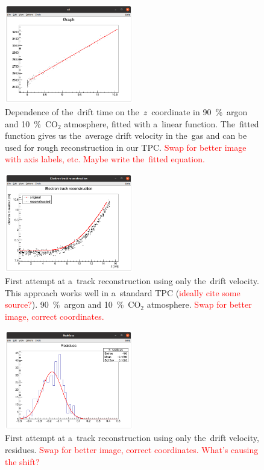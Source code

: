\documentclass[]{article}
\begin{document}
			\begin{figure}
				\centering
				\includegraphics[width=0.5\textwidth]{9010_zt.png}
				\caption{Dependence of the~drift time on the~$z$~coordinate in 90~\%~argon and 10~\%~CO$_2$ atmosphere, fitted with a~linear function. The~fitted function gives us the~average drift velocity in the~gas and can be used for rough reconstruction in our TPC. \textcolor{red}{Swap for better image with axis labels, etc. Maybe write the~fitted equation.}}
				\label{fig:9010zt}
			\end{figure}
			
			\begin{figure}
				\centering
				\includegraphics[width=0.5\textwidth]{9010_xz.png}
				\caption{First attempt at a~track reconstruction using only the~drift velocity. This approach works well in a~standard TPC (\textcolor{red}{ideally cite some source?}). 90~\%~argon and 10~\%~CO$_2$ atmosphere. \textcolor{red}{Swap for better image, correct coordinates.}}
				\label{fig:9010xz}
			\end{figure}
			
			\begin{figure}
				\centering
				\includegraphics[width=0.5\textwidth]{9010_res.png}
				\caption{First attempt at a~track reconstruction using only the~drift velocity, residues. \textcolor{red}{Swap for better image, correct coordinates. What's causing the shift?}}
				\label{fig:9010res}
			\end{figure}
			
\end{document}
